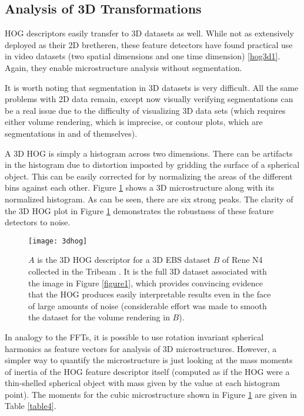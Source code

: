 \documentclass[review]{elsarticle}
\begin{document}
	\subsection{Analysis of 3D Transformations}
	HOG descriptors easily transfer to 3D datasets as well. While not as extensively deployed as their 2D bretheren, these feature detectors have found practical use in video datasets (two spatial dimensions and one time dimension) \ref{hog3d1}. Again, they enable microstructure analysis without segmentation.
	
	It is worth noting that segmentation in 3D datasets is very difficult. All the same problems with 2D data remain, except now visually verifying segmentations can be a real issue due to the difficulty of visualizing 3D data sets (which requires either volume rendering, which is imprecise, or contour plots, which are segmentations in and of themselves).

	A 3D HOG is simply a histogram across two dimensions. There can be artifacts in the histogram due to distortion imposted by gridding the surface of a spherical object. This can be easily corrected for by normalizing the areas of the different bins against each other. Figure \ref{figure4} shows a 3D microstructure along with its normalized histogram. As can be seen, there are six strong peaks. The clarity of the 3D HOG plot in Figure \ref{figure4} demonstrates the robustness of these feature detectors to noise.
	
	\begin{figure}[!ht]
  		\centering
    	\texttt{[image: 3dhog]}
  		\caption{ $A$ is the 3D HOG descriptor for a 3D EBS dataset $B$ of Rene N4 collected in the Tribeam \cite{tribeam}. It is the full 3D dataset associated with the image in Figure \ref{figure1}, which provides convincing evidence that the HOG produces easily interpretable results even in the face of large amounts of noise (considerable effort was made to smooth the dataset for the volume rendering in $B$). }
  		\label{figure4}
	\end{figure}

	In analogy to the FFTs, it is possible to use rotation invariant spherical harmonics \cite{spherical} as feature vectors for analysis of 3D microstructures. However, a simpler way to quantify the microstructure is just looking at the mass moments of inertia of the HOG feature descriptor itself (computed as if the HOG were a thin-shelled spherical object with mass given by the value at each histogram point). The moments for the cubic microstructure shown in Figure \ref{figure4} are given in Table \ref{table4}.
	
\end{document}
